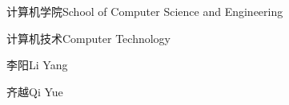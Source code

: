 

\school
{计算机学院}{School of Computer Science and Engineering}

\major
{计算机技术}{Computer Technology}




\thesisauthor
{李阳}{Li Yang}

\teacher
{齐越}{Qi Yue}

